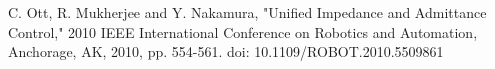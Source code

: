 \documentclass[paper=a4, fontsize=11pt]{scrartcl} %
\numberwithin{equation}{section} %
\numberwithin{figure}{section} %
\numberwithin{table}{section} %
\begin{document}
\begin{thebibliography}{16}  
	C. Ott, R. Mukherjee and Y. Nakamura, "Unified Impedance and Admittance Control," 2010 IEEE International Conference on Robotics and Automation, Anchorage, AK, 2010, pp. 554-561.
	doi: 10.1109/ROBOT.2010.5509861
\end{thebibliography}
\end{document}
